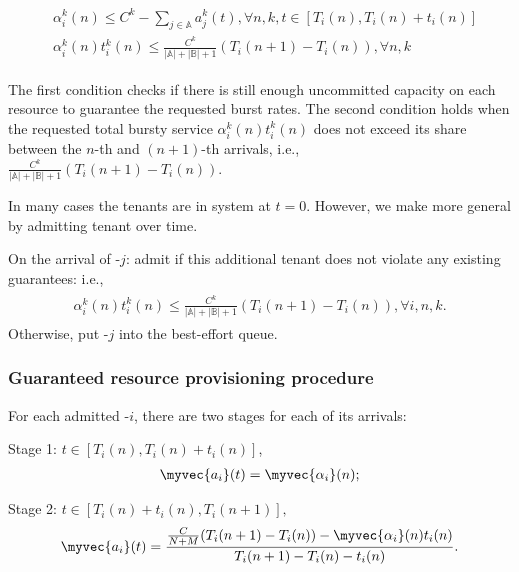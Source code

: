\begin{align}
	\label{eqn:bursty_adm_cond_2}
    \begin{aligned}
	& \alpha^k_i(n) \leq C^k-\sum_{j\in \mathbb{A}}a^k_j(t), \forall n, k, t\in[T_i(n), T_i(n)+t_i(n)]\\
	& \alpha^k_i(n) t^k_i(n) \leq \frac{C^k}{|\mathbb{A}|+|\mathbb{B}|+1}\left(T_i(n+1)-T_i(n)\right), \forall n, k	 
    \end{aligned}    
\end{align}


The first condition checks if there is still enough uncommitted capacity on each resource to guarantee the requested burst rates.
The second condition holds when the requested total bursty service $\alpha^k_i(n) t^k_i(n)$ does not exceed its share between the $n$-th and $(n+1)$-th arrivals, i.e., $\frac{C^k}{|\mathbb{A}|+|\mathbb{B}|+1}\left(T_i(n+1)-T_i(n)\right)$.

In many cases the \batch tenants are in system at $t=0$. 
However, we make \name more general by admitting \batch tenant over time.

On the arrival of \batch-$j$:
admit if this additional \batch tenant does not violate any existing guarantees:
i.e., 
\begin{align}
	\label{eqn:batch_adm_cond}
	\begin{aligned}
	\alpha^k_i(n) t^k_i(n)\leq\frac{C^k}{|\mathbb{A}|+|\mathbb{B}|+1}\left(T_i(n+1)-T_i(n)\right), \forall i, n,k.
	\end{aligned}
\end{align}
Otherwise, put \batch-$j$ into the best-effort queue.

\subsubsection{Guaranteed resource provisioning procedure}
For each admitted \bursty-$i$, there are two stages for each of its arrivals:

Stage 1: $t\in[T_i(n),T_i(n)+t_i(n)]$, 
\begin{align}
	\label{eqn:alpha_1}
	\begin{aligned}
	\myvec{a_i}(t)=\myvec{\alpha_i}(n);
	\end{aligned}
\end{align}

Stage 2: $t\in[T_i(n)+t_i(n), T_i(n+1)], $
\begin{align}
	\label{eqn:alpha_2}
	\begin{aligned}
	\myvec{a_i}(t)=\frac{\frac{C}{N+M}(T_i(n+1)-T_i(n))-\myvec{\alpha_i}(n) t_i(n)}{T_i(n+1)-T_i(n)-t_i(n)}.
	\end{aligned}
\end{align}

